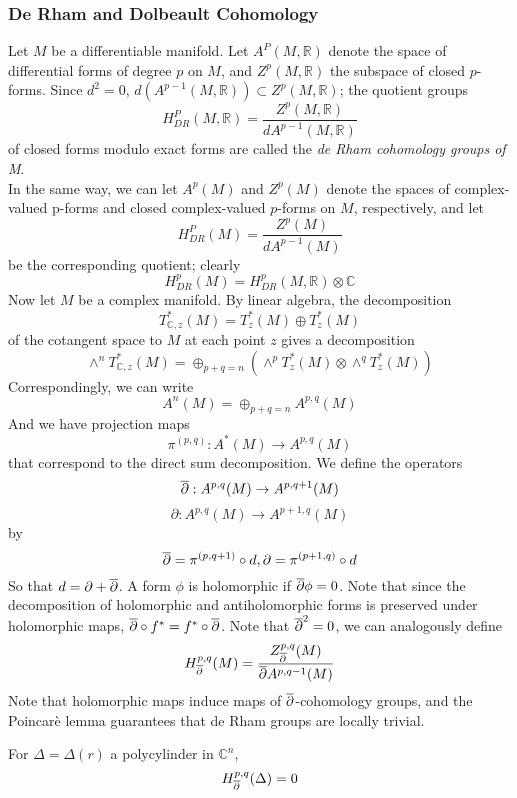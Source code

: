 \subsubsection{De Rham and Dolbeault Cohomology}

\indent Let $M$ be a differentiable manifold. Let $A^P(M, \mathbb{R})$ denote the space of differential forms of degree $p$ on $M$, and $Z^p(M, \mathbb{R})$ the subspace of closed $p$-forms. Since $d^2 = 0$, $d( A^{p-1}(M, \mathbb{R})) \subset Z^p(M, \mathbb{R})$; the quotient groups
\[
	H^P_{DR}(M, \mathbb{R}) = \frac{Z^p(M, \mathbb{R})}{dA^{p-1}(M, \mathbb{R})}
\]
of closed forms modulo exact forms are called the \textit{de Rham cohomology groups of M}. \\
\indent In the same way, we can let $A^p(M)$ and $Z^p(M)$ denote the spaces of complex-valued p-forms and closed complex-valued $p$-forms on $M$, respectively, and let
\[
	H^P_{DR}(M) = \frac{Z^p(M)}{dA^{p-1}(M)}
\]
be the corresponding quotient; clearly
\[
	H^p_{DR}(M) = H^p_{DR}(M, \mathbb{R}) \otimes \mathbb{C}
\]
\indent Now let $M$ be a complex manifold. By linear algebra, the decomposition
\[
	T^*_{ \mathbb{C},z}(M) = T^*_z (M) \oplus T^*_z (M)
\]
of the cotangent space to $M$ at each point $z$ gives a decomposition
\[
	\wedge^n T^*_{ \mathbb{C},z} (M) = \oplus_{p+q = n} \left( \wedge^p T^*_z(M) \otimes \wedge^q T^*_z (M) \right) 
\]
Correspondingly, we can write
\[
	A^n(M) = \oplus_{p+q = n} A^{p,q}(M)
\]
And we have projection maps
\[
	\pi^{(p,q)}: A^*(M) \to A^{p,q}(M)
\]
that correspond to the direct sum decomposition. We define the operators
\[
	\overline{\partial}: A^{p,q}(M) \to A^{p, q+1}(M)
\]
\[
	\partial: A^{p,q}(M) \to A^{p+1,q}(M)
\]
by
\[
	\overline{\partial} = \pi^{(p,q+1)} \circ d, \partial = \pi^{(p+1,q)} \circ d
\]
So that $d = \partial + \overline{\partial}$. A form $\phi$ is holomorphic if $\overline{\partial} \phi = 0$. Note that since the decomposition of holomorphic and antiholomorphic forms is preserved under holomorphic maps, $ \overline{\partial} \circ f^* = f^* \circ \overline{\partial}$. Note that $ \overline{\partial}^2 = 0$, we can analogously define
\[
	H^{p,q}_{ \overline{\partial} } (M) =  \frac{Z^{p,q}_{ \overline{\partial} }(M)}{ \overline{\partial} A^{p, q-1} (M) }
\]
Note that holomorphic maps induce maps of $ \overline{\partial}$-cohomology groups, and the Poincar\`e lemma guarantees that de Rham groups are locally trivial.


\begin{lem}

	For $\Delta = \Delta(r)$ a polycylinder in $ \mathbb{C}^n$,
	\[
		H^{p,q}_{ \overline{\partial} } (\Delta) = 0
	\]
	

\end{lem}

